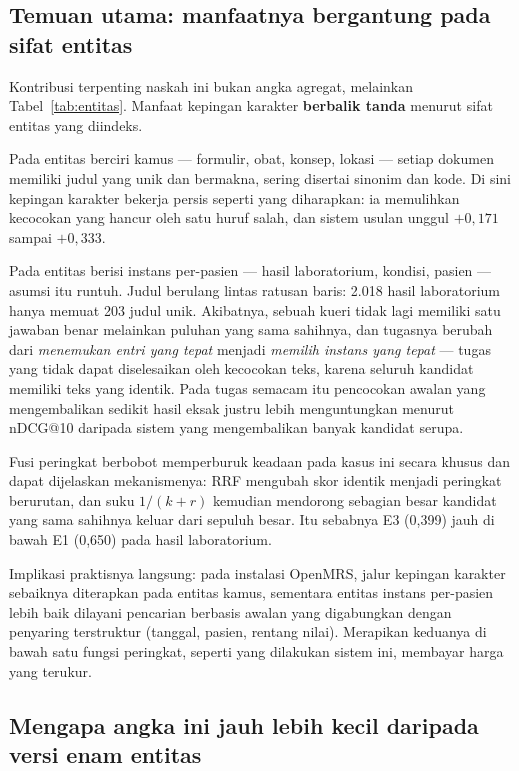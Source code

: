 \documentclass[journal,twoside,web]{ieeecolor}
\begin{document}
\subsection{Temuan utama: manfaatnya bergantung pada sifat entitas}

Kontribusi terpenting naskah ini bukan angka agregat, melainkan
Tabel~\ref{tab:entitas}. Manfaat kepingan karakter \textbf{berbalik tanda}
menurut sifat entitas yang diindeks.

Pada entitas berciri kamus --- formulir, obat, konsep, lokasi --- setiap dokumen
memiliki judul yang unik dan bermakna, sering disertai sinonim dan kode. Di sini
kepingan karakter bekerja persis seperti yang diharapkan: ia memulihkan
kecocokan yang hancur oleh satu huruf salah, dan sistem usulan unggul
$+0{,}171$ sampai $+0{,}333$.

Pada entitas berisi instans per-pasien --- hasil laboratorium, kondisi, pasien
--- asumsi itu runtuh. Judul berulang lintas ratusan baris: 2.018 hasil
laboratorium hanya memuat 203 judul unik. Akibatnya, sebuah kueri tidak lagi
memiliki satu jawaban benar melainkan puluhan yang sama sahihnya, dan tugasnya
berubah dari \emph{menemukan entri yang tepat} menjadi \emph{memilih instans yang
tepat} --- tugas yang tidak dapat diselesaikan oleh kecocokan teks, karena
seluruh kandidat memiliki teks yang identik. Pada tugas semacam itu pencocokan
awalan yang mengembalikan sedikit hasil eksak justru lebih menguntungkan menurut
nDCG@10 daripada sistem yang mengembalikan banyak kandidat serupa.

Fusi peringkat berbobot memperburuk keadaan pada kasus ini secara khusus dan
dapat dijelaskan mekanismenya: RRF mengubah skor identik menjadi peringkat
berurutan, dan suku $1/(k+r)$ kemudian mendorong sebagian besar kandidat yang
sama sahihnya keluar dari sepuluh besar. Itu sebabnya E3 (0,399) jauh di bawah
E1 (0,650) pada hasil laboratorium.

Implikasi praktisnya langsung: pada instalasi OpenMRS, jalur kepingan karakter
sebaiknya diterapkan pada entitas kamus, sementara entitas instans per-pasien
lebih baik dilayani pencarian berbasis awalan yang digabungkan dengan penyaring
terstruktur (tanggal, pasien, rentang nilai). Merapikan keduanya di bawah satu
fungsi peringkat, seperti yang dilakukan sistem ini, membayar harga yang terukur.

\subsection{Mengapa angka ini jauh lebih kecil daripada versi enam entitas}
\end{document}
